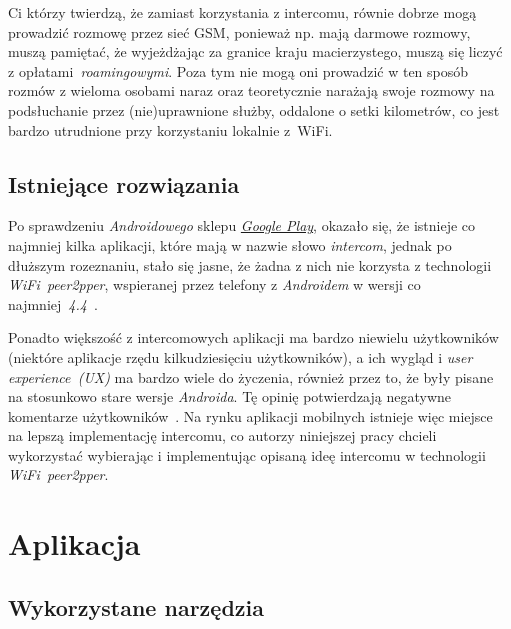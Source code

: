 \documentclass[a4paper,titlepage]{article}
\theoremstyle{break}
\begin{document}
Ci którzy twierdzą, że zamiast korzystania z intercomu, równie dobrze mogą prowadzić rozmowę przez sieć GSM, ponieważ np. mają darmowe rozmowy, muszą pamiętać, że wyjeżdżając za granice kraju macierzystego, muszą się liczyć z opłatami~\emph{roamingowymi}. Poza tym nie mogą oni prowadzić w ten sposób rozmów z wieloma osobami naraz oraz teoretycznie narażają swoje rozmowy na podsłuchanie przez (nie)uprawnione służby, oddalone o setki kilometrów, co jest bardzo utrudnione przy korzystaniu lokalnie z~WiFi.


\subsection{Istniejące rozwiązania}

Po sprawdzeniu \emph{Androidowego} sklepu \href{https://play.google.com/store}{\emph{Google Play}}, okazało się, że istnieje co najmniej kilka aplikacji, które mają w nazwie słowo \emph{intercom}, jednak po dłuższym rozeznaniu, stało się jasne, że żadna z nich nie korzysta z technologii \emph{WiFi~peer2pper}, wspieranej przez telefony z \emph{Androidem} w wersji co najmniej~\emph{4.4}~\cite{www:android-wifi-p2p,www:android-wifi-p2p-tutorial}.

Ponadto większość z intercomowych aplikacji ma bardzo niewielu użytkowników (niektóre aplikacje rzędu kilkudziesięciu użytkowników), a ich wygląd i \emph{user experience~(UX)} ma bardzo wiele do życzenia, również przez to, że były pisane na stosunkowo stare wersje \emph{Androida}. Tę opinię potwierdzają negatywne komentarze użytkowników~\cite{www:existing-android-intercoms}. Na rynku aplikacji mobilnych istnieje więc miejsce na lepszą implementację intercomu, co autorzy niniejszej pracy chcieli wykorzystać wybierając i implementując opisaną ideę intercomu w technologii \emph{WiFi~peer2pper}.


\section{Aplikacja}

\subsection{Wykorzystane narzędzia}
\end{document}

